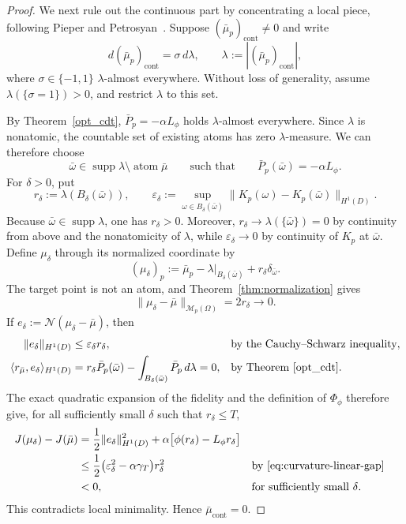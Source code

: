 \documentclass[11pt]{amsart}
\theoremstyle{definition}
\theoremstyle{remark}
\DeclareMathOperator{\atom}{atom}
\DeclareMathOperator{\cont}{cont}
\DeclareMathOperator{\supp}{supp}
\begin{document}
\begin{proof}
We next rule out the continuous part by concentrating a local piece,
following Pieper and Petrosyan~\cite[Appendix~C]{pieper2022nonconvex}.
Suppose $(\bar\mu_p)_{\cont}\neq0$ and write
\begin{equation*}
	d(\bar\mu_p)_{\cont}=\sigma\,d\lambda,
	\qquad
	\lambda:=|(\bar\mu_p)_{\cont}|,
\end{equation*}
where $\sigma\in\{-1,1\}$ $\lambda$-almost everywhere.
Without loss of generality, assume $\lambda(\{\sigma=1\})>0$,
and restrict $\lambda$ to this set.

By Theorem~\ref{opt_cdt}, $\bar P_p=-\alpha L_\phi$ holds
$\lambda$-almost everywhere. Since $\lambda$ is nonatomic, the
countable set of existing atoms has zero $\lambda$-measure.
We can therefore choose
\begin{equation*}
	\bar\omega\in\supp\lambda\setminus\atom\bar\mu
	\qquad\text{such that}\qquad
	\bar P_p(\bar\omega)=-\alpha L_\phi.
\end{equation*}
For $\delta>0$, put
\begin{equation*}
	r_\delta:=\lambda(B_\delta(\bar\omega)),
	\qquad
	\varepsilon_\delta
	:=\sup_{\omega\in B_\delta(\bar\omega)}
	\|K_p(\omega)-K_p(\bar\omega)\|_{H^1(D)}.
\end{equation*}
Because $\bar\omega\in\supp\lambda$, one has $r_\delta>0$. Moreover,
$r_\delta\to\lambda(\{\bar\omega\})=0$ by continuity from above and the
nonatomicity of $\lambda$, while
$\varepsilon_\delta\to0$ by continuity of $K_p$ at $\bar\omega$. Define
$\mu_\delta$ through its normalized coordinate by
\begin{equation*}
	(\mu_\delta)_p
	:=\bar\mu_p
	-\lambda|_{B_\delta(\bar\omega)}
	+r_\delta\delta_{\bar\omega}.
\end{equation*}
The target point is not an atom, and Theorem~\ref{thm:normalization} gives
\begin{equation*}
	\|\mu_\delta-\bar\mu\|_{\mathcal M_p(\Omega)}=2r_\delta\longrightarrow0.
\end{equation*}
If $e_\delta:=\mathcal N(\mu_\delta-\bar\mu)$, then
\begin{align*}
	\|e_\delta\|_{H^1(D)}
	&\leq\varepsilon_\delta r_\delta,
	&&\text{by the Cauchy--Schwarz inequality},\\
	\langle r_{\bar\mu},e_\delta\rangle_{H^1(D)}
	&=r_\delta\bar P_p(\bar\omega)
	-\int_{B_\delta(\bar\omega)}\bar P_p\,d\lambda
	=0,
	&&\text{by Theorem~\ref{opt_cdt}}.
\end{align*}
The exact quadratic expansion of the fidelity and the definition of
$\Phi_\phi$ therefore give, for all sufficiently small $\delta$ such that
$r_\delta\leq T$,
\begin{align*}
	J(\mu_\delta)-J(\bar\mu)
	&=\frac12\|e_\delta\|_{H^1(D)}^2
	+\alpha\bigl[\phi(r_\delta)-L_\phi r_\delta\bigr]\\
	&\leq\frac12\bigl(\varepsilon_\delta^2
	-\alpha\gamma_T\bigr)r_\delta^2
	&&\text{by \eqref{eq:curvature-linear-gap}}\\
	&<0,
	&&\text{for sufficiently small $\delta$}.
\end{align*}
This contradicts local minimality.  Hence $\bar\mu_{\cont}=0$.


\end{proof}
\end{document}
